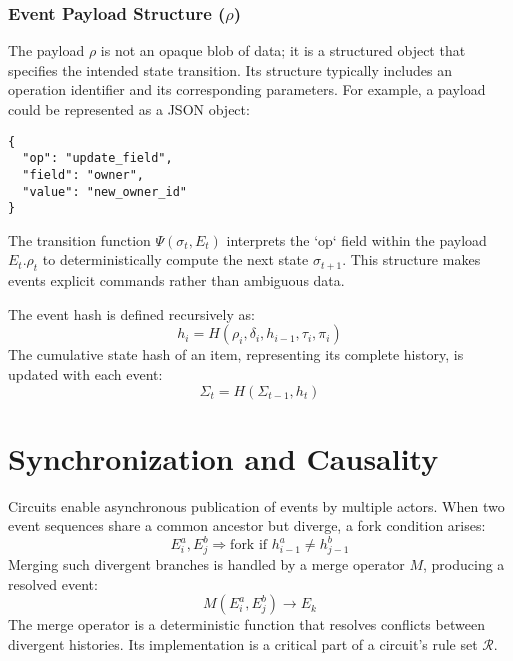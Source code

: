 \documentclass{article}
\begin{document}
\subsubsection*{Event Payload Structure ($\rho$)}
The payload $\rho$ is not an opaque blob of data; it is a structured object that specifies the intended state transition. Its structure typically includes an operation identifier and its corresponding parameters. For example, a payload could be represented as a JSON object:
\begin{verbatim}
{
  "op": "update_field",
  "field": "owner",
  "value": "new_owner_id"
}
\end{verbatim}
The transition function $\Psi(\sigma_t, E_t)$ interprets the `op` field within the payload $E_t.\rho_t$ to deterministically compute the next state $\sigma_{t+1}$. This structure makes events explicit commands rather than ambiguous data.

The event hash is defined recursively as:
\begin{equation}
h_i = H(\rho_i, \delta_i, h_{i-1}, \tau_i, \pi_i)
\end{equation}
The cumulative state hash of an item, representing its complete history, is updated with each event:
\begin{equation}
\Sigma_{t} = H(\Sigma_{t-1}, h_t)
\end{equation}

\section{Synchronization and Causality}

Circuits enable asynchronous publication of events by multiple actors. When two event sequences share a common ancestor but diverge, a fork condition arises:
\[ E_i^a, E_j^b \Rightarrow \text{fork if } h_{i-1}^a \neq h_{j-1}^b \]
Merging such divergent branches is handled by a merge operator $M$, producing a resolved event:
\begin{equation}
M(E_i^a, E_j^b) \to E_k
\end{equation}
The merge operator is a deterministic function that resolves conflicts between divergent histories. Its implementation is a critical part of a circuit's rule set $\mathcal{R}$.
\end{document}
